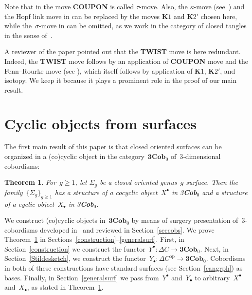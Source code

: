 \documentclass[pdftex]{sigma}
\numberwithin{equation}{section}
\newtheorem{Theorem}{Theorem}[section]
\newcommand{\co}{\colon}
\newcommand{\opp}{\mathrm{op}}
\newcommand{\Cob}{\textbf{Cob}}
\begin{document}
Note that in \cite[Theorem~3]{kerler-bridged-links} the move \textbf{COUPON} is called $\tau$-move. Also, the $\kappa$-move (see~\cite{Fenn-Rourke}) and the Hopf link move in \cite{kerler-bridged-links} can be replaced by the moves $\textbf{K}1$ and $\textbf{K}2'$ chosen here, while the~$\sigma$-move in \cite{kerler-bridged-links} can be omitted, as we work in the category of closed tangles in the sense of~\cite[Section~3.2.4]{kerler-bridged-links}.

\begin{Remark} A reviewer of the paper pointed out that the \textbf{TWIST} move is here redundant.
Indeed, the \textbf{TWIST} move follows by an application of \textbf{COUPON} move and the Fenn--Rourke move (see \cite{Fenn-Rourke}), which itself follows by application of $\textbf{K}1$, $\textbf{K}2'$, and isotopy. We keep it because it plays a prominent role in the proof of our main result.
\end{Remark}


\section{Cyclic objects from surfaces}\label{cobcyclic}
The first main result of this paper is that closed oriented surfaces can be organized in a (co)cyclic object in the category~$\textbf{3}\Cob_0$ of~$3$-dimensional cobordisms:


\begin{Theorem} \label{CYCINCOB}
For~$g\geq 1$, let $\Sigma_g$ be a closed oriented genus~$g$ surface. Then the fa\-mily~$\{\Sigma_g\}_{g\ge 1}$ has a structure of a cocyclic object~$X^\bullet$ in \emph{3\Cob}$_0$ and a structure of a cyclic object~$X_\bullet$ in \emph{3\Cob}$_0$.
\end{Theorem}
We construct (co)cyclic objects in~$\textbf{3}\Cob_0$ by means of surgery presentation of~$3$-cobordisms developed in~\cite{reshetikhin_invariants_1991, turaevqinvariants} and reviewed in Section~\ref{seccobs}.
We prove Theorem~\ref{CYCINCOB} in Sections~{\ref{construction}--\ref{generalsurf}}.
First, in Section~\ref{construction} we construct the functor~$Y^\bullet \co \Delta C\to \textbf{3}\Cob_0$.
Next, in Section~\ref{Stildesketch}, we construct the functor~$Y_{\bullet}\co \Delta C^{\opp}\to \textbf{3}\Cob_0$.
Cobordisms in both of these constructions have standard surfaces (see Section~\ref{cangrph}) as bases.
Finally, in Section~\ref{generalsurf} we pass from~$Y^\bullet$ and~$Y_\bullet$ to arbitrary~$X^\bullet$ and~$X_\bullet$, as stated in Theorem~\ref{CYCINCOB}.
\end{document}
